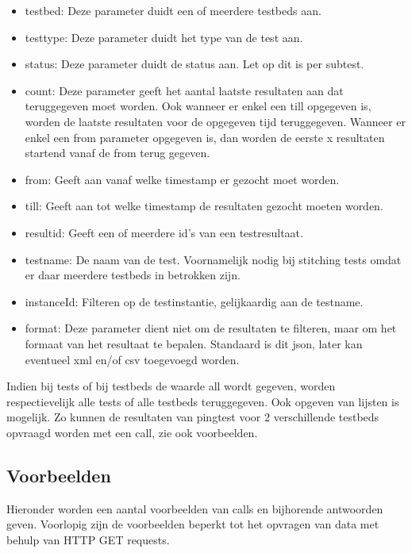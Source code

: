 \begin{itemize}
\item testbed: Deze parameter duidt een of meerdere testbeds aan.
\item testtype: Deze parameter duidt het type van de test aan.
\item status: Deze parameter duidt de status aan. Let op dit is per subtest.
\item count: Deze parameter geeft het aantal laatste resultaten aan dat teruggegeven moet worden. 
Ook wanneer er enkel een till opgegeven is, worden de laatste resultaten voor de opgegeven tijd teruggegeven.
Wanneer er enkel een from parameter opgegeven is, dan worden de eerste x resultaten startend vanaf de from terug gegeven.
\item from: Geeft aan vanaf welke timestamp er gezocht moet worden.
\item till: Geeft aan tot welke timestamp de resultaten gezocht moeten worden.
\item resultid: Geeft een of meerdere id\rq s van een testresultaat.
\item testname: De naam van de test. Voornamelijk nodig bij stitching tests omdat er daar meerdere testbeds in betrokken zijn.
\item instanceId: Filteren op de testinstantie, gelijkaardig aan de testname.
\item format: Deze parameter dient niet om de resultaten te filteren, maar om het formaat van het resultaat te bepalen. Standaard is dit json, later kan eventueel xml en/of csv toegevoegd worden.
\end{itemize}
Indien bij tests of bij testbeds de waarde all wordt gegeven, worden respectievelijk alle tests of alle testbeds teruggegeven. Ook opgeven van lijsten is mogelijk. Zo kunnen de resultaten van pingtest voor 2 verschillende testbeds opvraagd worden met een call, zie ook voorbeelden.
\clearpage

\subsection{Voorbeelden}
Hieronder worden een aantal voorbeelden van calls en bijhorende antwoorden geven.
Voorlopig zijn de voorbeelden beperkt tot het opvragen van data met behulp van HTTP GET requests.

